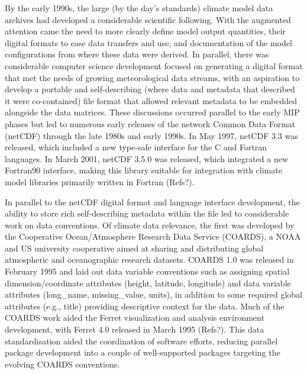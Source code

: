 \documentclass[gmd, preprint]{copernicus}
\newcommand{\mycomment}[1]{}
\def\cred#1{{\color{red}#1}}
\begin{document}
By the early 1990s, the large (by the day's standards) climate model data archives had developed a considerable scientific following. With the augmented attention came the need to more clearly define model output quantities, their digital formats to ease data transfers and use, and documentation of the model configurations from where these data were derived. In parallel, there was considerable computer science development focused on generating a digital format that met the needs of growing meteorological data streams, with an aspiration to develop a portable and self-describing (where data and metadata that described it were co-contained) file format that allowed relevant metadata to be embedded alongside the data matrices. These discussions occurred parallel to the early MIP phases but led to numerous early releases of the network Common Data Format (netCDF) through the late 1980s and early 1990s. In May 1997, netCDF 3.3 was released, which included a new type-safe interface for the C and Fortran languages. In March 2001, netCDF 3.5.0 was released, which integrated a new Fortran90 interface, making this library suitable for integration with climate model libraries primarily written in Fortran \cred{(Refs?)}.
\mycomment{
https://docs.unidata.ucar.edu/nug/2.0-draft/netcdf_history.html
}

In parallel to the netCDF digital format and language interface development, the ability to store rich self-describing metadata within the file led to considerable work on data conventions. Of climate data relevance, the first was developed by the Cooperative Ocean/Atmosphere Research Data Service (COARDS), a NOAA and US university cooperative aimed at sharing and distributing global atmospheric and oceanographic research datasets. COARDS 1.0 was released in February 1995 and laid out data variable conventions such as assigning spatial dimension/coordinate attributes (height, latitude, longitude) and data variable attributes (long\_name, missing\_value, units), in addition to some required global attributes (e.g., title) providing descriptive context for the data. Much of the COARDS work aided the Ferret visualization and analysis environment development, with Ferret 4.0 released in March 1995 \cred{(Refs?)}. This data standardisation aided the coordination of software efforts, reducing parallel package development into a couple of well-supported packages targeting the evolving COARDS conventions.
\mycomment{
https://ferret.pmel.noaa.gov/Ferret/documentation/coards-netcdf-conventions
https://ferret.pmel.noaa.gov/static/Documentation/Release_Notes/v400.html
Also NCAR CSM - see http://cfconventions.org/conventions.html
}
\end{document}
